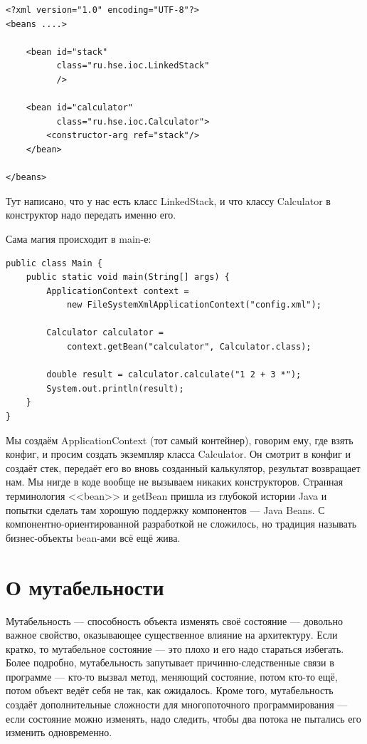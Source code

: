 \documentclass[a5paper]{article}
\begin{document}
\begin{verbatim}
<?xml version="1.0" encoding="UTF-8"?>
<beans ....>

    <bean id="stack"
          class="ru.hse.ioc.LinkedStack"
          />

    <bean id="calculator"
          class="ru.hse.ioc.Calculator">
        <constructor-arg ref="stack"/>
    </bean>

</beans>
\end{verbatim}

Тут написано, что у нас есть класс LinkedStack, и что классу Calculator в конструктор надо передать именно его.

Сама магия происходит в main-е:

\begin{verbatim}
public class Main {
    public static void main(String[] args) {
        ApplicationContext context = 
            new FileSystemXmlApplicationContext("config.xml");

        Calculator calculator = 
            context.getBean("calculator", Calculator.class);

        double result = calculator.calculate("1 2 + 3 *");
        System.out.println(result);
    }
}
\end{verbatim}

Мы создаём ApplicationContext (тот самый контейнер), говорим ему, где взять конфиг, и просим создать экземпляр класса Calculator. Он смотрит в конфиг и создаёт стек, передаёт его во вновь созданный калькулятор, результат возвращает нам. Мы нигде в  коде вообще не вызываем никаких конструкторов. Странная терминология <<bean>> и getBean пришла из глубокой истории Java и попытки сделать там хорошую поддержку компонентов --- Java Beans. С компонентно-ориентированной разработкой не сложилось, но традиция называть бизнес-объекты bean-ами всё ещё жива.

\section{О мутабельности}

Мутабельность --- способность объекта изменять своё состояние --- довольно важное свойство, оказывающее существенное влияние на архитектуру. Если кратко, то мутабельное состояние --- это плохо и его надо стараться избегать. Более подробно, мутабельность запутывает причинно-следственные связи в программе --- кто-то вызвал метод, меняющий состояние, потом кто-то ещё, потом объект ведёт себя не так, как ожидалось. Кроме того, мутабельность создаёт дополнительные сложности для многопоточного программирования --- если состояние можно изменять, надо следить, чтобы два потока не пытались его изменить одновременно.
\end{document}

